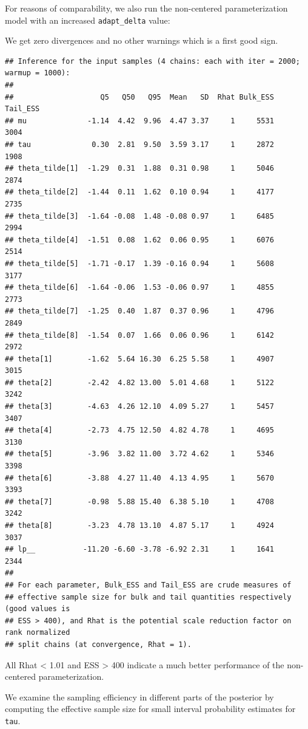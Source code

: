 \documentclass[american,]{article}
\begin{document}
For reasons of comparability, we also run the non-centered
parameterization model with an increased \texttt{adapt\_delta} value:

We get zero divergences and no other warnings which is a first good
sign.

\begin{verbatim}
## Inference for the input samples (4 chains: each with iter = 2000; warmup = 1000):
## 
##                    Q5   Q50   Q95  Mean   SD  Rhat Bulk_ESS Tail_ESS
## mu              -1.14  4.42  9.96  4.47 3.37     1     5531     3004
## tau              0.30  2.81  9.50  3.59 3.17     1     2872     1908
## theta_tilde[1]  -1.29  0.31  1.88  0.31 0.98     1     5046     2874
## theta_tilde[2]  -1.44  0.11  1.62  0.10 0.94     1     4177     2735
## theta_tilde[3]  -1.64 -0.08  1.48 -0.08 0.97     1     6485     2994
## theta_tilde[4]  -1.51  0.08  1.62  0.06 0.95     1     6076     2514
## theta_tilde[5]  -1.71 -0.17  1.39 -0.16 0.94     1     5608     3177
## theta_tilde[6]  -1.64 -0.06  1.53 -0.06 0.97     1     4855     2773
## theta_tilde[7]  -1.25  0.40  1.87  0.37 0.96     1     4796     2849
## theta_tilde[8]  -1.54  0.07  1.66  0.06 0.96     1     6142     2972
## theta[1]        -1.62  5.64 16.30  6.25 5.58     1     4907     3015
## theta[2]        -2.42  4.82 13.00  5.01 4.68     1     5122     3242
## theta[3]        -4.63  4.26 12.10  4.09 5.27     1     5457     3407
## theta[4]        -2.73  4.75 12.50  4.82 4.78     1     4695     3130
## theta[5]        -3.96  3.82 11.00  3.72 4.62     1     5346     3398
## theta[6]        -3.88  4.27 11.40  4.13 4.95     1     5670     3393
## theta[7]        -0.98  5.88 15.40  6.38 5.10     1     4708     3242
## theta[8]        -3.23  4.78 13.10  4.87 5.17     1     4924     3037
## lp__           -11.20 -6.60 -3.78 -6.92 2.31     1     1641     2344
## 
## For each parameter, Bulk_ESS and Tail_ESS are crude measures of 
## effective sample size for bulk and tail quantities respectively (good values is 
## ESS > 400), and Rhat is the potential scale reduction factor on rank normalized
## split chains (at convergence, Rhat = 1).
\end{verbatim}

All Rhat \textless{} 1.01 and ESS \textgreater{} 400 indicate a much
better performance of the non-centered parameterization.

We examine the sampling efficiency in different parts of the posterior
by computing the effective sample size for small interval probability
estimates for \texttt{tau}.
\end{document}
